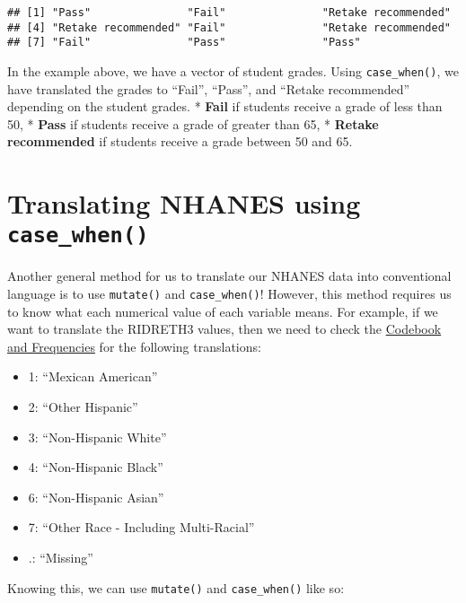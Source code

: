 \documentclass[
]{book}
\providecommand{\tightlist}{%
  \setlength{\itemsep}{0pt}\setlength{\parskip}{0pt}}
\begin{document}
\begin{verbatim}
## [1] "Pass"               "Fail"               "Retake recommended"
## [4] "Retake recommended" "Fail"               "Retake recommended"
## [7] "Fail"               "Pass"               "Pass"
\end{verbatim}

In the example above, we have a vector of student grades. Using \texttt{case\_when()}, we have translated the grades to ``Fail'', ``Pass'', and ``Retake recommended'' depending on the student grades.
* \textbf{Fail} if students receive a grade of less than 50,
* \textbf{Pass} if students receive a grade of greater than 65,
* \textbf{Retake recommended} if students receive a grade between 50 and 65.

\hypertarget{translating-nhanes-using-case_when}{%
\section{\texorpdfstring{Translating NHANES using \texttt{case\_when()}}{Translating NHANES using case\_when()}}\label{translating-nhanes-using-case_when}}

Another general method for us to translate our NHANES data into conventional language is to use \texttt{mutate()} and \texttt{case\_when()}! However, this method requires us to know what each numerical value of each variable means. For example, if we want to translate the RIDRETH3 values, then we need to check the \href{https://wwwn.cdc.gov/Nchs/Nhanes/2013-2014/DEMO_H.htm}{Codebook and Frequencies} for the following translations:

\begin{itemize}
\tightlist
\item
  1: ``Mexican American''
\item
  2: ``Other Hispanic''
\item
  3: ``Non-Hispanic White''
\item
  4: ``Non-Hispanic Black''
\item
  6: ``Non-Hispanic Asian''
\item
  7: ``Other Race - Including Multi-Racial''
\item
  .: ``Missing''
\end{itemize}

Knowing this, we can use \texttt{mutate()} and \texttt{case\_when()} like so:
\end{document}
